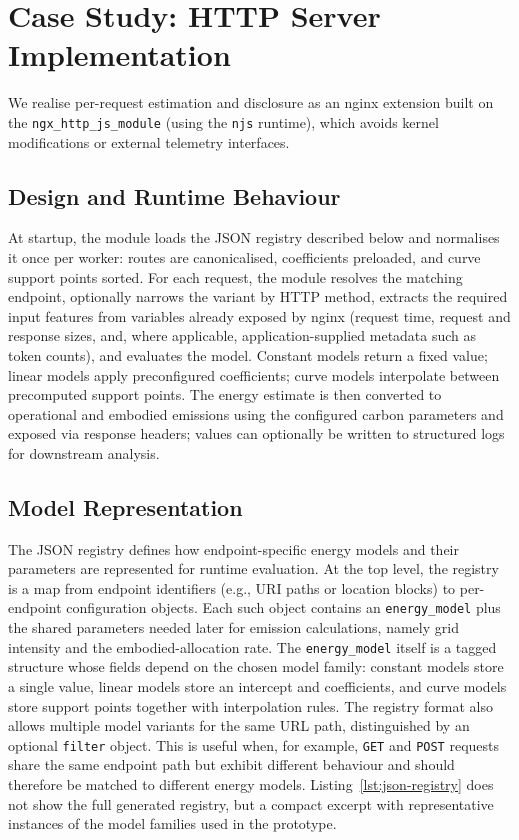 \documentclass[sigconf]{acmart}
\begin{document}
\section{Case Study: HTTP Server Implementation}
\label{sec:implementation}
We realise per-request estimation and disclosure as an nginx extension built on the \texttt{ngx\_http\_js\_module} (using the \texttt{njs} runtime), which avoids kernel modifications or external telemetry interfaces.

\subsection{Design and Runtime Behaviour}
At startup, the module loads the JSON registry described below and normalises it once per worker: routes are canonicalised, coefficients preloaded, and curve support points sorted. For each request, the module resolves the matching endpoint, optionally narrows the variant by HTTP method, extracts the required input features from variables already exposed by nginx (request time, request and response sizes, and, where applicable, application-supplied metadata such as token counts), and evaluates the model. Constant models return a fixed value; linear models apply preconfigured coefficients; curve models interpolate between precomputed support points. The energy estimate is then converted to operational and embodied emissions using the configured carbon parameters and exposed via response headers; values can optionally be written to structured logs for downstream analysis.

\subsection{Model Representation}
The JSON registry defines how endpoint-specific energy models and their parameters are represented for runtime evaluation. At the top level, the registry is a map from endpoint identifiers (e.g., URI paths or location blocks) to per-endpoint configuration objects. Each such object contains an \texttt{energy\_model} plus the shared parameters needed later for emission calculations, namely grid intensity and the embodied-allocation rate. The \texttt{energy\_model} itself is a tagged structure whose fields depend on the chosen model family: constant models store a single value, linear models store an intercept and coefficients, and curve models store support points together with interpolation rules. The registry format also allows multiple model variants for the same URL path, distinguished by an optional \texttt{filter} object. This is useful when, for example, \texttt{GET} and \texttt{POST} requests share the same endpoint path but exhibit different behaviour and should therefore be matched to different energy models. Listing~\ref{lst:json-registry} does not show the full generated registry, but a compact excerpt with representative instances of the model families used in the prototype.
\end{document}
